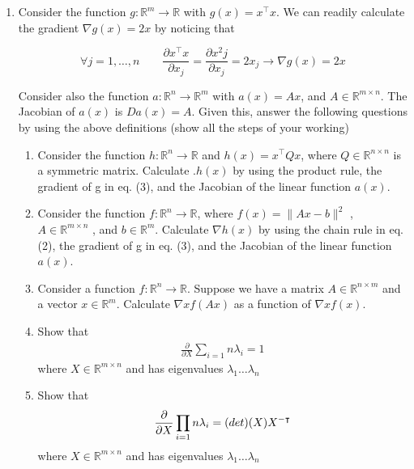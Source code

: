 \documentclass[12pt]{article}
\begin{document}
\begin{enumerate}

    \item Consider the function $g : \mathbb{R}^m \rightarrow \mathbb{R}$ with $g(x)= x^\intercal x$. We can readily calculate the gradient $\nabla g(x)=2x$ by noticing that 
    
    \begin{equation}
        \forall j = 1, \dots, n \qquad \frac{\partial x^\intercal x}{\partial x_j} = \frac{\partial x^2 j}{\partial x_j} = 2x_j \rightarrow \nabla g(x) = 2x
    \end{equation}

    Consider also the function $a : \mathbb{R}^n \rightarrow \mathbb{R}^m$ with $a(x)= Ax$, and $A \in \mathbb{R}^{m \times n}$. The Jacobian of $a(x)$ is $Da(x)= A$. 
    Given this, answer the following questions by using the above definitions (show all the steps of your working) 

    \begin{enumerate}

        \item Consider the function $h : \mathbb{R}^n \rightarrow \mathbb{R}$ and $h(x)= x^\intercal Qx$, where $Q \in \mathbb{R}^{n \times n}$ is a symmetric matrix. Calculate .$h(x)$ by using the product rule, the gradient of g in eq. (3), and the Jacobian of the linear function $a(x)$. 
        \item Consider the function $f : \mathbb{R}^n \rightarrow \mathbb{R}$, where $f(x)= \lVert Ax - b \rVert ^2$ , $A \in \mathbb{R}^{m \times n}$ , and $b \in \mathbb{R}^m $. Calculate $\nabla h(x)$ by using the chain rule in eq. (2), the gradient of g in eq. (3), and the Jacobian of the linear function $a(x)$. 
        \item Consider a function $f : \mathbb{R}^n \rightarrow \mathbb{R}$. Suppose we have a matrix $A \in \mathbb{R}^{n \times m}$ and a vector $x \in \mathbb{R}^m $. Calculate $\nabla xf(Ax)$ as a function of $\nabla xf(x)$.
        \item Show that
        \begin{align*}
            \frac{\partial}{\partial X} \sum_{i=1}{n} \lambda_i = 1
        \end{align*}
        where $X \in \mathbb{R}^{m \times n}$ and has eigenvalues $\lambda_1 \dots \lambda_n$
        \item Show that
        \begin{align*}
            \frac{\partial}{\partial X} \prod_{i=1}{n} \lambda_i = \textrm(det)(X)X^{-\intercal}
        \end{align*}
        where $X \in \mathbb{R}^{m \times n}$ and has eigenvalues $\lambda_1 \dots \lambda_n$
    \end{enumerate}   
    

\end{enumerate}
\end{document}

